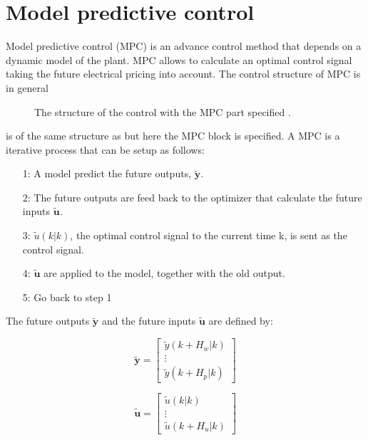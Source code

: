 \section{Model predictive control}
\label{sec:MPC}

Model predictive control (MPC) is an advance control method that depends on a dynamic model of the plant. MPC allows to calculate an optimal control signal taking the future electrical pricing into account. The control structure of MPC is in general 

\begin{figure}[H]
\centering
 
\caption{The structure of the control with the MPC part specified \cite{Camacho2007}.}
\label{mpc_structure}
\end{figure}

 is of the same structure as  but here the MPC block is specified. A MPC is a iterative process that can be setup as follows: 

\begin{itemize}
\item[1:] A model predict the future outputs, $\pmb{\tilde y}$.
\item[2:] The future outputs are feed back to the optimizer that calculate the future inputs $\pmb{\tilde u}$.
\item[3:] $\tilde u(k|k)$, the optimal control signal to the current time k, is sent as the control signal.
\item[4:] $\pmb{\tilde u}$ are applied to the model, together with the old output.
\item[5:] Go back to step 1 
\end{itemize}

The future outputs $\pmb{\tilde y}$ and the future inputs $\pmb{\tilde u}$ are defined by:

\begin{equation}
\pmb{\tilde y} =  
 \begin{bmatrix}
  \tilde y(k+H_w|k)\\
  \vdots  \\
  \tilde y(k+H_p|k)   
 \end{bmatrix}
\end{equation}

\begin{equation}
\pmb{\tilde u} =  
 \begin{bmatrix}
  \tilde u(k|k)\\
  \vdots  \\
  \tilde u(k+H_u|k)   
 \end{bmatrix}
\end{equation}

